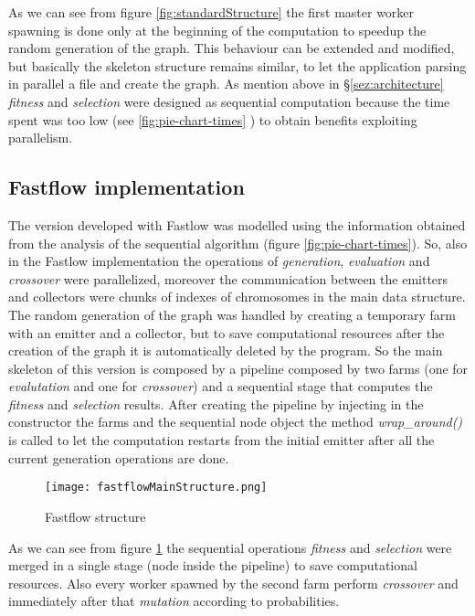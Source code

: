 As we can see from figure \ref{fig:standardStructure} the first master worker spawning is done only at the beginning of the computation to speedup the random generation of the graph. This behaviour can be extended and modified, but basically the skeleton structure remains similar, to let the application parsing in parallel a file and create the graph. As mention above in \S \ref{sez:architecture} \textit{fitness} and \textit{selection} were designed as sequential computation because the time spent was too low (see \ref{fig:pie-chart-times} ) to obtain benefits exploiting parallelism.
 
\subsection{Fastflow implementation}
The version developed with Fastlow \cite{fastflow} was modelled using the information obtained from the analysis of the sequential algorithm (figure \ref{fig:pie-chart-times}). So, also in the Fastlow implementation the operations of \textit{generation}, \textit{evaluation} and \textit{crossover} were parallelized, moreover the communication between the emitters and collectors were chunks of indexes of chromosomes in the main data structure. The random generation of the graph was handled by creating a temporary farm with an emitter and a collector, but to save computational resources after the creation of the graph it is automatically deleted by the program. So the main skeleton of this version is composed by a pipeline composed by two farms (one for \textit{evalutation} and one for \textit{crossover}) and a sequential stage that computes the \textit{fitness} and \textit{selection} results. After creating the pipeline by injecting in the constructor the farms and the sequential node object the method \textit{wrap\_around()} is called to let the computation restarts from the initial emitter after all the current generation operations are done. 

\vspace{1.5em}
\begin{figure}[h]
	\centering
	\texttt{[image: fastflowMainStructure.png]}
	\vspace{0.15em}
	\caption{Fastflow structure}
	\label{fig:fastflowStructure}
\end{figure}
\vspace{1em}

As we can see from figure \ref{fig:fastflowStructure} the sequential operations \textit{fitness} and \textit{selection} were merged in a single stage (node inside the pipeline) to save computational resources. Also every worker spawned by the second farm perform \textit{crossover} and immediately after that \textit{mutation} according to probabilities.


